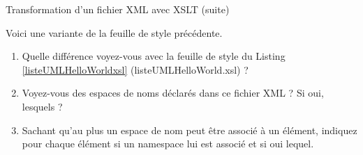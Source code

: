 \begin{frame}{Transformation d'un fichier XML avec XSLT (suite)}

Voici une variante de la feuille de style pr\'ec\'edente.

\begin{center}
\begin{minipage}{0.7\textwidth}

\end{minipage}
\end{center}

\begin{small}
\begin{exoblock}
\begin{enumerate}
\item Quelle diff\'erence voyez-vous avec la feuille de style du Listing \ref{listeUMLHelloWorldxsl} (listeUMLHelloWorld.xsl) ? 
\item Voyez-vous des espaces de noms d\'eclar\'es dans ce fichier XML ? Si oui, lesquels ?
\item Sachant qu'au plus un espace de nom peut \^etre associ\'e \`a un \'el\'ement, indiquez pour chaque \'el\'ement si un namespace lui est associ\'e et si oui lequel.
\end{enumerate}
\end{exoblock}
\end{small}

\end{frame}

